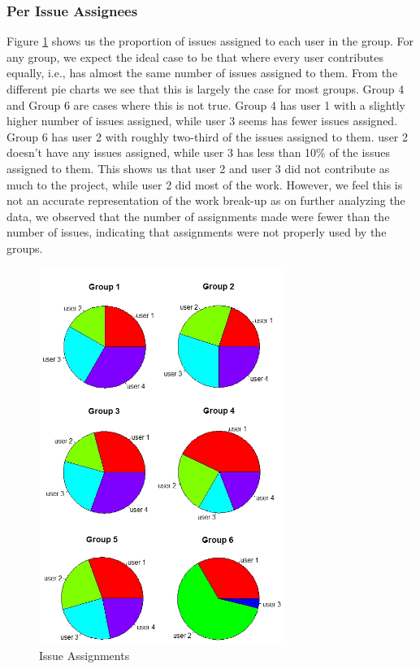 \documentclass{acm_proc_article-sp}
\begin{document}
\subsubsection{Per Issue Assignees}
Figure \ref{fig:assign} shows us the proportion of issues assigned to each user in the group. For any group, we expect the ideal case to be that where every user contributes equally, i.e., has almost the same number of issues assigned to them. From the different pie charts we see that this is largely the case for most groups. Group 4 and Group 6 are cases where this is not true. Group 4 has user 1 with a slightly higher number of issues assigned, while user 3 seems has fewer issues assigned. Group 6 has user 2 with roughly two-third of the issues assigned to them. user 2 doesn't have any issues assigned, while user 3 has less than 10\% of the issues assigned to them. This shows us that user 2 and user 3 did not contribute as much to the project, while user 2 did most of the work. However, we feel this is not an accurate representation of the work break-up as on further analyzing the data, we observed that the number of assignments made were fewer than the number of issues, indicating that assignments were not properly used by the groups.

\begin{figure}[h]
\centering
\includegraphics[width=8cm]{img/assignments}
\caption{Issue Assignments}
\label{fig:assign}
\end{figure}
\end{document}
